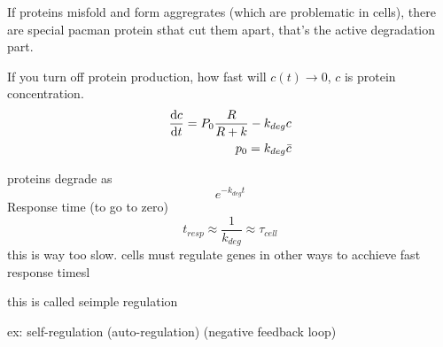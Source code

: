 \documentclass{article}
\begin{document}
If proteins misfold and form aggregrates (which are problematic in cells), there are special pacman protein sthat cut them apart, that's the active degradation part. 

If you turn off protein production, how fast will $c(t) \longrightarrow 0$, $c$ is protein concentration. 
\begin{equation}
	\begin{split}
	\dv {c}{t} = P_0 \frac{R}{R+ k} - k_{deg}c\\
	p_0 = k_{deg} \bar c
	\end{split}
\end{equation}

proteins degrade as 
\begin{equation}
	e ^ {-k_{deg}t}
\end{equation}
Response time (to go to zero) 
\begin{equation}
	t_{resp}\approx \frac{1}{k_{deg}} \approx \tau_{cell}
\end{equation}
this is way too slow. 
cells must regulate genes in other ways to acchieve fast response timesl 

this is called seimple regulation 

ex: self-regulation (auto-regulation)
(negative feedback loop)
\end{document}
